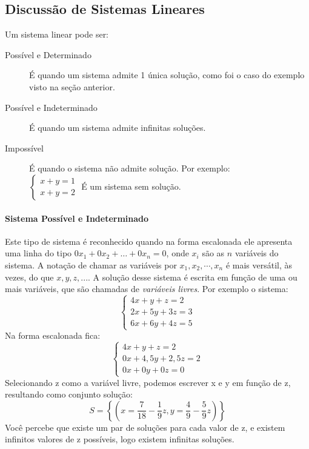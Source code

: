   \subsection{Discussão de Sistemas Lineares}
  Um sistema linear pode ser:
  \begin{description}
    \item[Possível e Determinado]É quando um sistema admite 1 única solução, como foi o caso do exemplo visto na seção
 anterior.
    \item[Possível e Indeterminado]É quando um sistema admite infinitas soluções.
    \item [Impossível]É quando o sistema não admite solução. Por exemplo:\\$\left\{\begin{array}{l}
      x+y=1\\x+y=2
    \end{array}\right.$ É um sistema sem solução.
  \end{description}
\paragraph{Sistema Possível e Indeterminado}
  Este tipo de sistema é reconhecido quando na forma escalonada ele apresenta uma linha do tipo $0x_1+0x_2+
\dots+0x_n=0$, onde $x_i$ são as $n$ variáveis do sistema. A notação de chamar as variáveis por $x_1, x_2, \cdots, x_n$ é 
mais versátil, às vezes, do que $x, y, z, ...$. A solução desse sistema é escrita em função de uma
 ou mais variáveis, que são chamadas de \textit{variáveis livres}. Por exemplo o sistema:\[
  \left\{\begin{array}{l}
    4x+y+z=2\\2x+5y+3z=3\\6x+6y+4z=5
  \end{array}\right.\]
  Na forma escalonada fica:\[
  \left\{\begin{array}{l}
    4x+y+z=2\\0x+4,5y+2,5z=2\\0x+0y+0z=0
  \end{array}\right.\]
  Selecionando z como a variável livre, podemos escrever x e y em função de z, resultando como conjunto solução:
    \[
      S=\left\{ \left( x=\frac{7}{18}-\frac{1}{9}z,y=\frac{4}{9}-\frac{5}{9}z\right)\right\}
    \]
    Você percebe que existe um par de soluções para cada valor de z, e existem infinitos valores de z possíveis, logo existem infinitas soluções.
